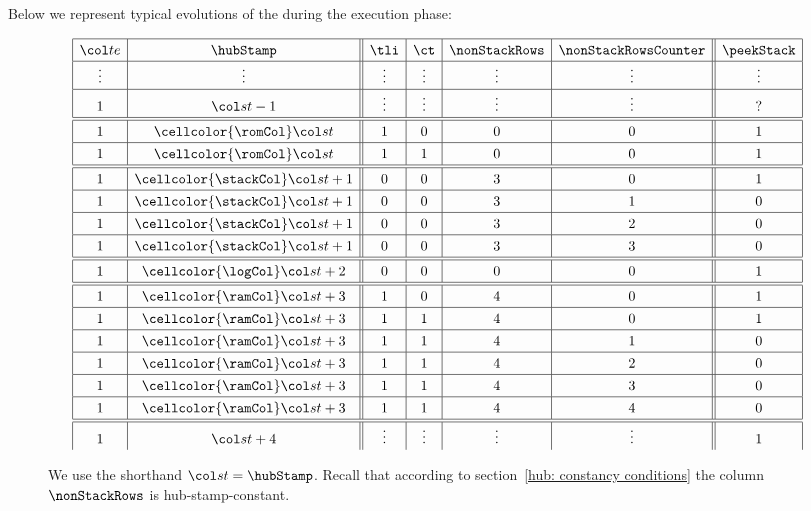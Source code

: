 Below we represent typical evolutions of the \hubStamp{} during the execution phase:
\begin{figure}[h!]
	\[
		\renewcommand{\arraystretch}{1.3}
		\begin{array}{|c|c||c|c|c|c||c|} \hline
			\te    & \hubStamp                      & \tli   & \ct    & \nonStackRows & \nonStackRowsCounter & \peekStack \\ \hline
			\vdots & \vdots                         & \vdots & \vdots & \vdots        & \vdots               & \vdots     \\ \hline
			1      & \st - 1                        & \vdots & \vdots & \vdots        & \vdots               & ?          \\ \hline \hline
			1      & {\cellcolor{\romCol}\st}       & 1      & 0      & 0             & 0                    & 1          \\ \hline
			1      & {\cellcolor{\romCol}\st}       & 1      & 1      & 0             & 0                    & 1          \\ \hline \hline
			1      & {\cellcolor{\stackCol}\st + 1} & 0      & 0      & 3             & 0                    & 1          \\ \hline
			1      & {\cellcolor{\stackCol}\st + 1} & 0      & 0      & 3             & 1                    & 0          \\ \hline
			1      & {\cellcolor{\stackCol}\st + 1} & 0      & 0      & 3             & 2                    & 0          \\ \hline
			1      & {\cellcolor{\stackCol}\st + 1} & 0      & 0      & 3             & 3                    & 0          \\ \hline \hline
			1      & {\cellcolor{\logCol}\st + 2}   & 0      & 0      & 0             & 0                    & 1          \\ \hline \hline
			1      & {\cellcolor{\ramCol}\st + 3}   & 1      & 0      & 4             & 0                    & 1          \\ \hline
			1      & {\cellcolor{\ramCol}\st + 3}   & 1      & 1      & 4             & 0                    & 1          \\ \hline
			1      & {\cellcolor{\ramCol}\st + 3}   & 1      & 1      & 4             & 1                    & 0          \\ \hline
			1      & {\cellcolor{\ramCol}\st + 3}   & 1      & 1      & 4             & 2                    & 0          \\ \hline
			1      & {\cellcolor{\ramCol}\st + 3}   & 1      & 1      & 4             & 3                    & 0          \\ \hline
			1      & {\cellcolor{\ramCol}\st + 3}   & 1      & 1      & 4             & 4                    & 0          \\ \hline \hline
			1      & \st + 4                        & \vdots & \vdots & \vdots        & \vdots               & 1          \\
		\end{array}
	\]
	\caption{We use the shorthand $\st = \hubStamp$.
	Recall that according to section~\ref{hub: constancy conditions} the column $\nonStackRows$ is hub-stamp-constant.}
\end{figure}
